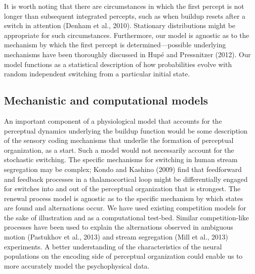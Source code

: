It is worth noting that there are circumstances in which the first percept is not longer than subsequent integrated percepts, such as when buildup resets after a switch in attention (Denham et al., 2010). Stationary distributions might be appropriate for such circumstances. Furthermore, our model is agnostic as to the mechanism by which the first percept is determined—possible underlying mechanisms have been thoroughly discussed in Hupé and Pressnitzer (2012). Our model functions as a statistical description of how probabilities evolve with random independent switching from a particular initial state.

\subsection{Mechanistic and computational models}

An important component of a physiological model that accounts for the perceptual dynamics underlying the buildup function would be some description of the sensory coding mechanisms that underlie the formation of perceptual organization, as a start. Such a model would not necessarily account for the stochastic switching. The specific mechanisms for switching in human stream segregation may be complex; Kondo and Kashino (2009) find that feedforward and feedback processes in a thalamocortical loop might be differentially engaged for switches into and out of the perceptual organization that is strongest. The renewal process model is agnostic as to the specific mechanism by which states are found and alternations occur. We have used existing competition models for the sake of illustration and as a computational test-bed. Similar competition-like processes have been used to explain the alternations observed in ambiguous motion (Pastukhov et al., 2013) and stream segregation (Mill et al., 2013) experiments. A better understanding of the characteristics of the neural populations on the encoding side of perceptual organization could enable us to more accurately model the psychophysical data.

